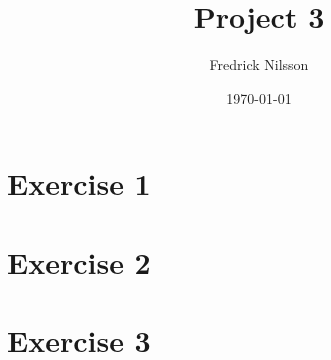 \documentclass[12pt]{article}
\title{Project 3}
\author{Fredrick Nilsson}
\date{\today}
\begin{document}
\maketitle

\tableofcontents

\newpage

\section*{Exercise 1}

\newpage

\section*{Exercise 2}

\newpage

\section*{Exercise 3}

\newpage


\end{document}
